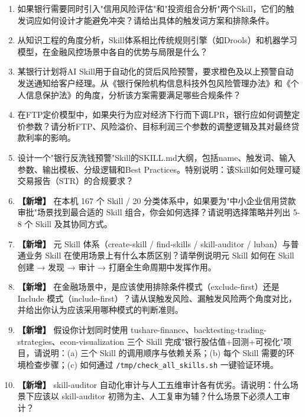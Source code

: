 \begin{enumerate}[leftmargin=2em]
  \item 如果银行需要同时引入"信用风险评估"和"投资组合分析"两个Skill，它们的触发词应如何设计才能避免冲突？请给出具体的触发词方案和排除条件。

  \item 从知识工程的角度分析，Skill体系相比传统规则引擎（如Drools）和机器学习模型，在金融风控场景中各自的优势与局限是什么？

  \item 某银行计划将AI Skill用于自动化的贷后风险预警，要求橙色及以上预警自动发送通知给客户经理。从《银行保险机构信息科技外包风险管理办法》和《个人信息保护法》的角度，分析该方案需要满足哪些合规条件？

  \item 在FTP定价模型中，如果央行为应对经济下行而下调LPR，银行应如何调整定价参数？请分析FTP、风险溢价、目标利润三个参数的调整逻辑及其对最终贷款利率的影响。

  \item 设计一个"银行反洗钱预警"Skill的SKILL.md大纲，包括name、触发词、输入参数、输出模板、分级逻辑和Best Practices。特别说明：该Skill如何处理可疑交易报告（STR）的合规要求？

  \item \textbf{【新增】} 在本机 167 个 Skill / 20 分类体系中，如果要为"中小企业信用贷款审批"场景找到最合适的 Skill 组合，你会如何选择？请说明选择策略并列出 5-8 个 Skill 及其协同方式。

  \item \textbf{【新增】} 元 Skill 体系（create-skill / find-skills / skill-auditor / luban）与普通业务 Skill 在使用场景上有什么本质区别？请举例说明元 Skill 如何在 Skill 创建 → 发现 → 审计 → 打磨全生命周期中发挥作用。

  \item \textbf{【新增】} 在金融场景中，是应该使用排除条件模式（exclude-first）还是 Include 模式（include-first）？请从误触发风险、漏触发风险两个角度对比，并给出你认为应该采用哪种模式的判断准则。

  \item \textbf{【新增】} 假设你计划同时使用 tushare-finance、backtesting-trading-strategies、econ-visualization 三个 Skill 完成"银行股估值+回测+可视化"项目，请说明：(a) 三个 Skill 的调用顺序与依赖关系；(b) 每个 Skill 需要的环境检查步骤；(c) 如何通过 \texttt{/tmp/check_all_skills.sh} 一键验证环境。

  \item \textbf{【新增】} skill-auditor 自动化审计与人工五维审计各有优劣。请说明：什么场景下应该以 skill-auditor 初筛为主、人工复审为辅？什么场景下必须人工审计？
\end{enumerate}

